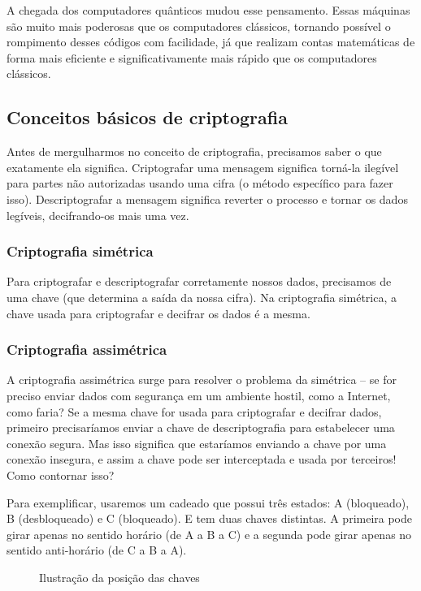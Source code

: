 A chegada dos computadores quânticos mudou esse pensamento. Essas máquinas são muito mais poderosas que os computadores clássicos, tornando possível o rompimento desses códigos com facilidade, já que realizam contas matemáticas de forma mais eficiente e significativamente mais rápido que os computadores clássicos.

\subsection{Conceitos básicos de criptografia}
Antes de mergulharmos no conceito de criptografia, precisamos saber o que exatamente ela significa. Criptografar uma mensagem significa torná-la ilegível para partes não autorizadas usando uma cifra (o método específico para fazer isso). Descriptografar a mensagem significa reverter o processo e tornar os dados legíveis, decifrando-os mais uma vez.

\subsubsection{Criptografia simétrica}
Para criptografar e descriptografar corretamente nossos dados, precisamos de uma chave (que determina a saída da nossa cifra). Na criptografia simétrica, a chave usada para criptografar e decifrar os dados é a mesma.

\subsubsection{Criptografia assimétrica}
A criptografia assimétrica surge para resolver o problema da simétrica – se for preciso enviar dados com segurança em um ambiente hostil, como a Internet, como faria? Se a mesma chave for usada para criptografar e decifrar dados, primeiro precisaríamos enviar a chave de descriptografia para estabelecer uma conexão segura. Mas isso significa que estaríamos enviando a chave por uma conexão insegura, e assim a chave pode ser interceptada e usada por terceiros! Como contornar isso?

Para exemplificar, usaremos um cadeado que possui três estados: A (bloqueado), B (desbloqueado) e C (bloqueado). E tem duas chaves distintas. A primeira pode girar apenas no sentido horário (de A a B a C) e a segunda pode girar apenas no sentido anti-horário (de C a B a A).

\vspace{1cm}
\begin{figure}[H] \centering 
  \caption{\label{fig:5} Ilustração da posição das chaves} 
\end{figure}

